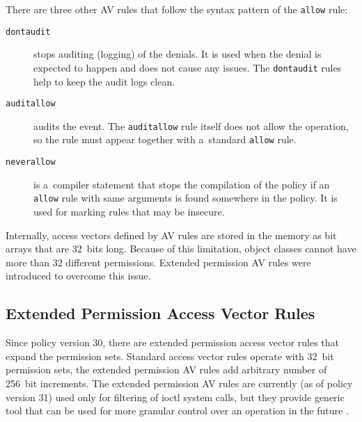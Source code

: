 There are three other AV rules that follow the syntax pattern of the
\texttt{allow} rule:
\begin{description}
    \item [\texttt{dontaudit}] stops auditing (logging) of the denials. It is
        used when the denial is expected to happen and does not cause any
        issues. The \texttt{dontaudit} rules help to keep the audit logs clean.
    \item [\texttt{auditallow}] audits the event. The \texttt{auditallow} rule
        itself does not allow the operation, so the rule must appear together
        with a~standard \texttt{allow} rule.
    \item [\texttt{neverallow}] is a~compiler statement that stops the
        compilation of the policy if an \texttt{allow} rule with same arguments
        is found somewhere in the policy.  It is used for marking rules that may
        be insecure.
\end{description}
Internally, access vectors defined by AV rules are stored in the memory as bit
arrays that are 32~bits long. Because of this limitation, object classes cannot
have more than 32 different permissions. Extended permission AV rules were
introduced to overcome this issue.

\subsection{Extended Permission Access Vector Rules}
\label{extavrules}

Since policy version 30, there are extended permission access vector rules that
expand the permission sets. Standard access vector rules operate with 32~bit
permission sets, the extended permission AV rules add arbitrary number of
256~bit increments. The extended permission AV rules are currently (as of policy
version 31) used only for filtering of ioctl system calls, but they provide
generic tool that can be used for more granular control over an operation in the
future \cite{selinuxmailxperms}.

